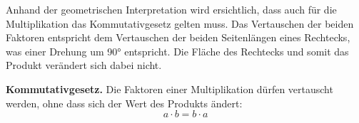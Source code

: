 Anhand der geometrischen Interpretation wird ersichtlich, dass auch für die Multiplikation das Kommutativgesetz gelten muss. Das Vertauschen der beiden Faktoren entspricht dem Vertauschen der beiden Seitenlängen eines Rechtecks, was einer Drehung um \ang{90} entspricht. Die Fläche des Rechtecks und somit das Produkt verändert sich dabei nicht.
\begin{center}
\end{center}
\begin{theorem}
  \textbf{Kommutativgesetz.} Die Faktoren einer Multiplikation dürfen vertauscht werden, ohne dass sich der Wert des Produkts ändert:
  \[
    a \cdot b = b \cdot a
  \]
\end{theorem}


